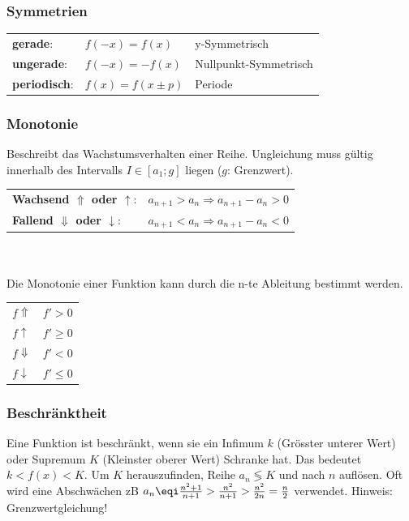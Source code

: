 \subsubsection{Symmetrien}
\begin{tabular}{lll}
	\textbf{gerade}:& $f(-x) = f(x)$ & y-Symmetrisch\\
	\textbf{ungerade}:& $f(-x) = -f(x)$ & Nullpunkt-Symmetrisch\\
	\textbf{periodisch}:& $f(x) = f(x \pm p)$& Periode \\
\end{tabular}

\subsubsection{Monotonie}\label{monotonie}
Beschreibt das Wachstumsverhalten einer Reihe. Ungleichung muss gültig innerhalb des Intervalls $I \in [a_1;g]$ liegen ($g$: Grenzwert).\\
\noindent
\begin{tabular}{ll}
	\textbf{Wachsend $\Uparrow$ oder $\uparrow$}:& $a_{n+1} > a_n \Rightarrow a_{n+1} - a_n > 0$\\
	\textbf{Fallend $\Downarrow$ oder $\downarrow$}:& $a_{n+1} < a_n \Rightarrow a_{n+1} - a_n < 0$\\
\end{tabular}\\ \\

\noindent Die Monotonie einer Funktion kann durch die n-te Ableitung bestimmt werden.\\
\noindent\begin{tabular}{ll}
	$f \Uparrow$ & $f' > 0$\\
	$f \uparrow$ & $f' \geq 0$\\
	$f \Downarrow$ & $f' < 0$\\
	$f \downarrow$ & $f' \leq 0$\\
\end{tabular}

\subsubsection{Beschränktheit}\label{beschränkt}
Eine Funktion ist beschränkt, wenn sie ein Infimum $k$ (Grösster unterer Wert) oder Supremum $K$ (Kleinster oberer Wert) Schranke hat. Das bedeutet $k < f(x) < K$. Um $K$ herauszufinden, Reihe $a_n \lessgtr K$ und nach $n$ auflösen. Oft wird eine Abschwächen zB $a_n \eqi \frac{n^2+1}{n+1} > \frac{n^2}{n+1} > \frac{n^2}{2n} = \frac{n}{2}$ verwendet. Hinweis: Grenzwertgleichung!

